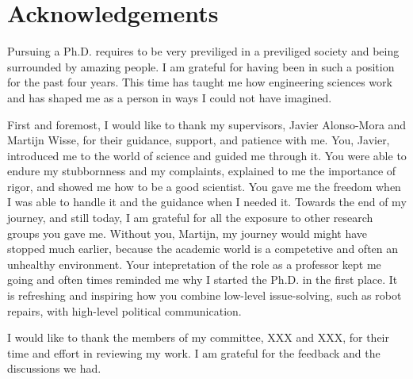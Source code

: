 \chapter*{Acknowledgements}
\label{acknowledgements}



Pursuing a Ph.D. requires to be very previliged in a previliged society and
being surrounded by amazing people. I am grateful for having been in such a
position for the past four years. This time has taught me how engineering
sciences work and has shaped me as a person in ways I could not have imagined.

First and foremost, I would like to thank my supervisors, Javier Alonso-Mora
and Martijn Wisse, for their guidance, support, and patience with me. You,
Javier, introduced me to the world of science and guided me through it. You
were able to endure my stubbornness and my complaints, explained to me the
importance of rigor, and showed me how to be a good scientist. You gave me the
freedom when I was able to handle it and the guidance when I needed it. Towards
the end of my journey, and still today, I am grateful for all the exposure to
other research groups you gave me. Without you, Martijn, my journey would might
have stopped much earlier, because the academic world is a competetive and often
an unhealthy environment. Your intepretation of the role as a professor kept me
going and often times reminded me why I started the Ph.D. in the first place.
It is refreshing and inspiring how you combine low-level issue-solving, such as
robot repairs, with high-level political communication.

I would like to thank the members of my committee, XXX and XXX, for their time
and effort in reviewing my work. I am grateful for the feedback and the
discussions we had.

